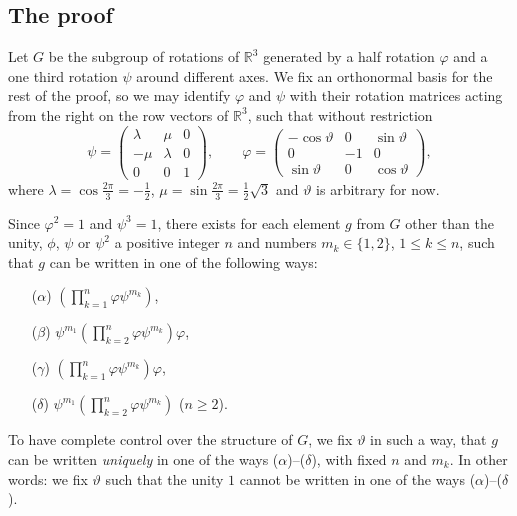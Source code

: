 \documentclass[12pt]{article}
\newcommand{\Prod}{\prod\limits}
\newcommand{\mbb}{\mathbb}
\newcommand{\mmm}[9]{\left(\begin{array}{rrr}#1&#2&#3\\#4&#5&#6\\#7&#8&#9\end{array}\right)}
\begin{document}
\subsection*{The proof}

Let $G$ be the subgroup of rotations of $\mbb{R}^3$ generated by a
half rotation $\varphi$ and a one third rotation $\psi$ around
different axes. We fix an orthonormal basis for the rest
of the proof, so we may identify $\varphi$ and $\psi$ with their
rotation matrices acting from the right on the row vectors of
$\mbb{R}^3$, such that without restriction
\begin{equation*}
\psi=\mmm{\lambda}{\mu}{0}{-\mu}{\lambda}{0}{0}{0}{1},\qquad\varphi=\mmm{-\cos\vartheta}{0}{\sin\vartheta}{0}{-1}{0}{\sin\vartheta}{0}{\cos\vartheta},
\end{equation*}
where $\lambda=\cos\frac{2\pi}{3}=-\frac{1}{2}$,
$\mu=\sin\frac{2\pi}{3}=\frac{1}{2}\sqrt{3}$ and $\vartheta$ is
arbitrary for now.

Since $\varphi^2=1$ and $\psi^3=1$, there exists
for each element $g$ from $G$ other than the unity, $\phi$, $\psi$ or $\psi^2$ a
positive integer $n$ and numbers $m_k\in\{1,2\}$, $1\leq k\leq n$,
such that $g$ can be written in one of the following ways:
\begin{itemize}
\item[($\alpha$)]$\left(\Prod_{k=1}^n\varphi\psi^{m_k}\right)$,
\item[($\beta$)]$\psi^{m_1}\left(\Prod_{k=2}^n\varphi\psi^{m_k}\right)\varphi$,
\item[($\gamma$)]$\left(\Prod_{k=1}^n\varphi\psi^{m_k}\right)\varphi$,
\item[($\delta$)]$\psi^{m_1}\left(\Prod_{k=2}^n\varphi\psi^{m_k}\right)$
  ($n\geq 2$).
\end{itemize}

To have complete control over the structure of $G$, we fix $\vartheta$
in such a way, that $g$ can be written \emph{uniquely} in one of the
ways ($\alpha$)--($\delta$), with fixed $n$ and $m_k$. In other words: we
fix $\vartheta$ such that the unity $1$ cannot be written in
one of the ways ($\alpha$)--($\delta$).
\end{document}
